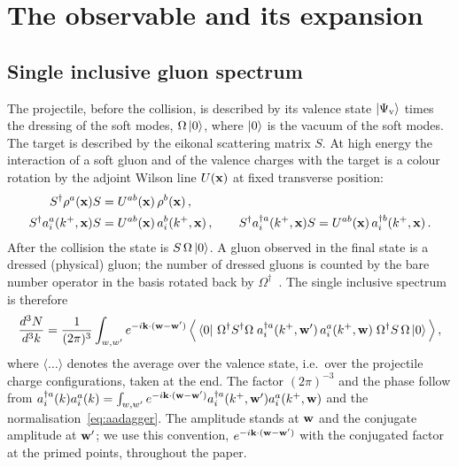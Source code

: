\section{The observable and its expansion}\label{sec:observable}

\subsection{Single inclusive gluon spectrum}\label{sec:observable_def}

The projectile, before the collision, is described by its valence state $\ket{\Psi_{\rm v}}$ times the dressing of the soft modes, $\Omega\ket{0}$, where $\ket0$ is the vacuum of the soft modes. The target is described by the eikonal scattering matrix $S$. At high energy the interaction of a soft gluon and of the valence charges with the target is a colour rotation by the adjoint Wilson line $U(\mathbf{x})$ at fixed transverse position:
\begin{align}\label{eq:Srotation}
S^\dagger\rho^a(\mathbf{x})S&=U^{ab}(\mathbf{x})\,\rho^b(\mathbf{x})\,,\notag\\
S^\dagger a^a_i(k^+,\mathbf{x})S&=U^{ab}(\mathbf{x})\,a^b_i(k^+,\mathbf{x})\,,\qquad
S^\dagger a^{\dagger a}_i(k^+,\mathbf{x})S=U^{ab}(\mathbf{x})\,a^{\dagger b}_i(k^+,\mathbf{x})\,.
\end{align}
After the collision the state is $S\,\Omega\ket0$. A gluon observed in the final state is a dressed (physical) gluon; the number of dressed gluons is counted by the bare number operator in the basis rotated back by $\Omega^\dagger$~\cite{Kovner:2006wr}. The single inclusive spectrum is therefore
\begin{align}\label{eq:observable}
\frac{d^3N}{d^3k}=\frac{1}{(2\pi)^3}\int_{w,w'}e^{-i\mathbf{k}\cdot(\mathbf{w}-\mathbf{w}')}\,
\Big\langle\bra0\,\Omega^\dagger S^\dagger\Omega\;a^{\dagger a}_i(k^+,\mathbf{w}')\,a^a_i(k^+,\mathbf{w})\;\Omega^\dagger S\,\Omega\ket0\Big\rangle\,,
\end{align}
where $\langle\dots\rangle$ denotes the average over the valence state, i.e.\ over the projectile charge configurations, taken at the end. The factor $(2\pi)^{-3}$ and the phase follow from $a^{\dagger a}_i(k)a^a_i(k)=\int_{w,w'}e^{-i\mathbf{k}\cdot(\mathbf{w}-\mathbf{w}')}a^{\dagger a}_i(k^+,\mathbf{w}')a^a_i(k^+,\mathbf{w})$ and the normalisation~\eqref{eq:aadagger}. The amplitude stands at $\mathbf{w}$ and the conjugate amplitude at $\mathbf{w}'$; we use this convention, $e^{-i\mathbf{k}\cdot(\mathbf{w}-\mathbf{w}')}$ with the conjugated factor at the primed points, throughout the paper.

